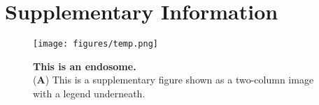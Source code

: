 
\onecolumn %
\fancyhead{} %
\renewcommand{\floatpagefraction}{0.1}
\lfoot[\bSupInf]{\dAuthor}
\rfoot[\dAuthor]{\cSupInf}
\newpage

\captionsetup*{format=largeformat} %
\setcounter{figure}{0} %
\setcounter{equation}{0} %
\makeatletter
\renewcommand{\thefigure}{S\@arabic\c@figure} %
\makeatother
\def\theequation{S\arabic{equation}}


\newpage
\section*{Supplementary Information}\label{sec:supplementary-information}

\begin{figure*}[!ht]
	\centering
	\texttt{[image: figures/temp.png]}
	\caption{\textbf{This is an endosome.}\\
		(\textbf{A}) This is a supplementary figure shown as a two-column image with a legend underneath.}
	\label{suppfig:endosome}
\end{figure*}



































